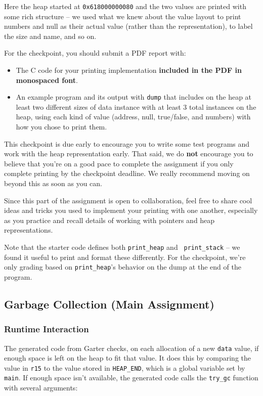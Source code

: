 \documentclass[10pt, oneside]{article}
\begin{document}
Here the heap started at {\tt 0x618000000080} and the two values are printed
with some rich structure -- we used what we knew about the value layout to
print numbers and null as their actual value (rather than the
representation), to label the size and name, and so on.

For the checkpoint, you should submit a PDF report with:

\begin{itemize}
\item The C code for your printing implementation {\bf included in the PDF in
monospaced font}.
\item An example program and its output with {\tt dump} that includes on the
heap at least two different sizes of data instance with at least 3 total
instances on the heap, using each kind of value (address, null, true/false,
and numbers) with how you chose to print them.
\end{itemize}

This checkpoint is due early to encourage you to write some test programs and
work with the heap representation early. That said, we do {\bf not} encourage
you to believe that you're on a good pace to complete the assignment if you
only complete printing by the checkpoint deadline. We really recommend moving
on beyond this as soon as you can.

Since this part of the assignment is open to collaboration, feel free to
share cool ideas and tricks you used to implement your printing with one
another, especially as you practice and recall details of working with
pointers and heap representations.

Note that the starter code defines both {\tt print\_heap} and {\tt
print\_stack} -- we found it useful to print and format these differently.
For the checkpoint, we're only grading based on {\tt print\_heap}'s behavior
on the dump at the end of the program.

\subsection*{Garbage Collection (Main Assignment)}

\subsubsection*{Runtime Interaction}

The generated code from Garter checks, on each allocation of a new {\tt data}
value, if enough space is left on the heap to fit that value. It does this by
comparing the value in {\tt r15} to the value stored in {\tt HEAP\_END},
which is a global variable set by {\tt main}. If enough space isn't
available, the generated code calls the {\tt try\_gc} function with several arguments:
\end{document}
